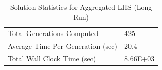 \begin{table}[!htbp]
  \centering
\caption{Solution Statistics for Aggregated LHS (Long Run)}
  \label{tab:stat_agg_long}
  \begin{tabular}{|l|l|}
    \hline
	  Total Generations Computed & 425\\
    Average Time Per Generation (sec) & 20.4\\
    Total Wall Clock Time (sec)	 & 8.66E+03\\
    \hline
  \end{tabular}
\end{table} 

